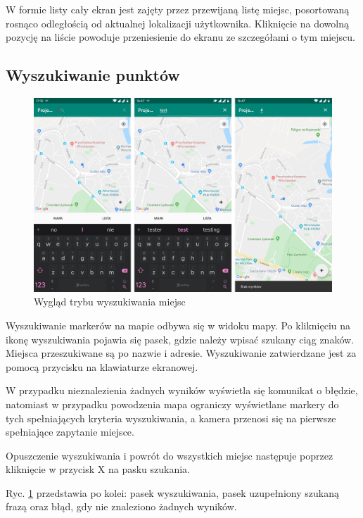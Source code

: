 \documentclass[polish,polish,a4paper,12pt]{article}
\begin{document}
	W formie listy cały ekran jest zajęty przez przewijaną listę miejsc, posortowaną rosnąco odległością od aktualnej lokalizacji użytkownika. Kliknięcie na dowolną pozycję na liście powoduje przeniesienie do ekranu ze szczegółami o tym miejscu.

	\subsection{Wyszukiwanie punktów}

	\begin{figure}[H]
		\centering
		\includegraphics[width = \textwidth]{screenshot-search}
		\caption{Wygląd trybu wyszukiwania miejsc}
		\label{fig:screenshot-search}
	\end{figure}

	Wyszukiwanie markerów na mapie odbywa się w widoku mapy. Po kliknięciu na ikonę wyszukiwania pojawia się pasek, gdzie należy wpisać szukany ciąg znaków. Miejsca przeszukiwane są po nazwie i adresie. Wyszukiwanie zatwierdzane jest za pomocą przycisku na klawiaturze ekranowej.

	W przypadku nieznalezienia żadnych wyników wyświetla się komunikat o błędzie, natomiast w przypadku powodzenia mapa ograniczy wyświetlane markery do tych spełniających kryteria wyszukiwania, a kamera przenosi się na pierwsze spełniające zapytanie miejsce.

	Opuszczenie wyszukiwania i powrót do wszystkich miejsc następuje poprzez kliknięcie w przycisk X na pasku szukania.

	Ryc. \ref{fig:screenshot-search} przedstawia po kolei: pasek wyszukiwania, pasek uzupełniony szukaną frazą oraz błąd, gdy nie znaleziono żadnych wyników.
\end{document}
